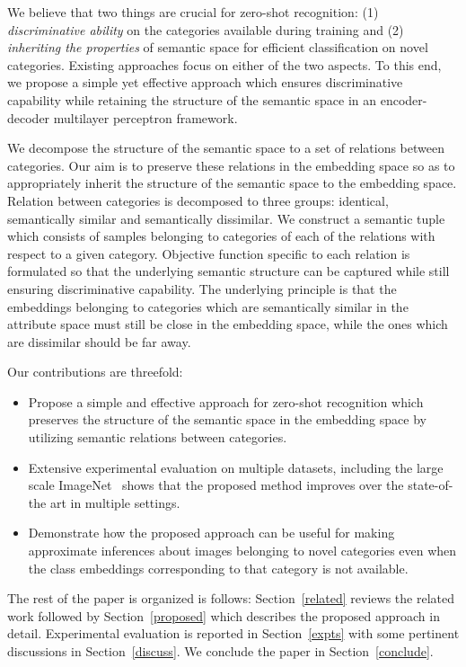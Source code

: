 \documentclass[10pt,twocolumn,letterpaper]{article}
\begin{document}
We believe that two things are crucial for zero-shot recognition: (1) \textit{discriminative ability} on the categories available during training and (2) \textit{inheriting the properties} of semantic space for efficient classification on novel categories.  
Existing approaches focus on either of the two aspects.
To this end, we propose a simple yet effective approach which ensures discriminative capability while retaining the structure of the semantic space in an encoder-decoder multilayer perceptron framework. %

We decompose the structure of the semantic space to a set of relations between categories. 
Our aim is to preserve these relations in the embedding space so as to appropriately inherit the structure of the semantic space to the embedding space. 
Relation between categories is decomposed to three groups: identical, semantically similar and semantically dissimilar.
We construct a semantic tuple which consists of samples belonging to categories of each of the relations with respect to a given category. 
Objective function specific to each relation is formulated so that the underlying semantic structure can be captured while still ensuring discriminative capability. 
The underlying principle is that the  embeddings belonging to categories which are semantically similar in the attribute space must still be close in the embedding space, while the ones which are dissimilar should be far away. 

Our contributions are threefold:
\begin{itemize}
	\itemsep0em
	\item Propose a simple and effective approach for zero-shot recognition which preserves the structure of the semantic space in the embedding space by utilizing semantic relations between categories.
	\item Extensive experimental evaluation on multiple datasets, including the large scale ImageNet~\cite{deng2009imagenet} shows that the proposed method improves over the state-of-the art in multiple settings.
	\item Demonstrate how the proposed approach can be useful for making approximate inferences about images belonging to novel categories even when the class embeddings corresponding to that category is not available. 
\end{itemize}
The rest of the paper is organized is follows: Section~\ref{related} reviews the related work followed by Section~\ref{proposed} which describes the proposed approach in detail. Experimental evaluation is reported in Section~\ref{expts} with some pertinent discussions in Section~\ref{discuss}. %
We conclude the paper in Section~\ref{conclude}.
\end{document}
